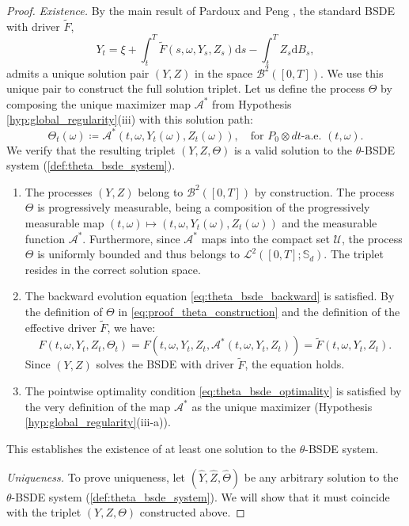 \documentclass[12pt, letterpaper]{amsart}
\newcommand{\Thetacal}{\mathcal{A}}
\newcommand{\Ucal}{\mathcal{U}}
\newcommand{\Bcal}{\mathcal{B}}
\newcommand{\Lcalp}[1]{\mathcal{L}^{#1}}
\newcommand{\Sd}{\mathbb{S}_d}
\newcommand{\dd}{\mathrm{d}}
\theoremstyle{plain}
\theoremstyle{definition}
\theoremstyle{remark}
\numberwithin{equation}{section} %
\begin{document}
\begin{proof}
\vspace{1ex}
\noindent\textit{Existence.} By the main result of Pardoux and Peng \cite{PardouxPeng1990}, the standard BSDE with driver $\tilde{F}$,
\begin{equation*}
    Y_t = \xi + \int_t^T \tilde{F}(s, \omega, Y_s, Z_s) \dd s - \int_t^T Z_s \dd B_s,
\end{equation*}
admits a unique solution pair $(Y,Z)$ in the space $\Bcal^2([0,T])$. We use this unique pair to construct the full solution triplet. Let us define the process $\Theta$ by composing the unique maximizer map $\Thetacal^*$ from Hypothesis \ref{hyp:global_regularity}(iii) with this solution path:
\begin{equation}\label{eq:proof_theta_construction}
    \Theta_t(\omega) \coloneqq \Thetacal^*(t, \omega, Y_t(\omega), Z_t(\omega)), \quad \text{for } P_0 \otimes dt\text{-a.e. } (t,\omega).
\end{equation}
We verify that the resulting triplet $(Y,Z,\Theta)$ is a valid solution to the $\theta$-BSDE system (\cref{def:theta_bsde_system}).
\begin{enumerate}[label=(\alph*)]
    \item The processes $(Y,Z)$ belong to $\Bcal^2([0,T])$ by construction. The process $\Theta$ is progressively measurable, being a composition of the progressively measurable map $(t,\omega) \mapsto (t,\omega,Y_t(\omega),Z_t(\omega))$ and the measurable function $\Thetacal^*$. Furthermore, since $\Thetacal^*$ maps into the compact set $\Ucal$, the process $\Theta$ is uniformly bounded and thus belongs to $\Lcalp{2}([0,T]; \Sd)$. The triplet resides in the correct solution space.
    \item The backward evolution equation \eqref{eq:theta_bsde_backward} is satisfied. By the definition of $\Theta$ in \eqref{eq:proof_theta_construction} and the definition of the effective driver $\tilde{F}$, we have:
    \[ F(t,\omega,Y_t,Z_t,\Theta_t) = F(t,\omega,Y_t,Z_t,\Thetacal^*(t,\omega,Y_t,Z_t)) = \tilde{F}(t,\omega,Y_t,Z_t). \]
    Since $(Y,Z)$ solves the BSDE with driver $\tilde{F}$, the equation holds.
    \item The pointwise optimality condition \eqref{eq:theta_bsde_optimality} is satisfied by the very definition of the map $\Thetacal^*$ as the unique maximizer (Hypothesis \ref{hyp:global_regularity}(iii-a)).
\end{enumerate}
This establishes the existence of at least one solution to the $\theta$-BSDE system.

\vspace{1ex}
\noindent\textit{Uniqueness.} To prove uniqueness, let $(\hat{Y}, \hat{Z}, \hat{\Theta})$ be any arbitrary solution to the $\theta$-BSDE system (\cref{def:theta_bsde_system}). We will show that it must coincide with the triplet $(Y,Z,\Theta)$ constructed above.


\end{proof}
\end{document}
